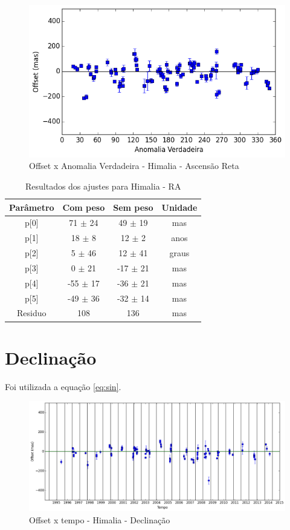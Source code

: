\documentclass[11pt,a4paper]{report}
\begin{document}
\begin{figure}[h]
\caption{Offset x Anomalia Verdadeira - Himalia - Ascensão Reta}
\includegraphics[scale=0.45]{Himalia/RA_anom.png}  
\end{figure}

\begin{table}[h!]
\caption{\label{Tab: Himalia-RA} Resultados dos ajustes para Himalia - RA}
\begin{centering}
\begin{tabular}{cccc}
\hline
\hline
Parâmetro & Com peso & Sem peso & Unidade\tabularnewline
\hline
p[0] & 71 $\pm$ 24 & 49 $\pm$ 19 & mas\\
p[1] & 18 $\pm$ 8 & 12 $\pm$ 2 & anos\\
p[2] & 5 $\pm$ 46 & 12 $\pm$ 41 & graus\\
p[3] & 0 $\pm$ 21 & -17 $\pm$ 21 & mas\\
p[4] & -55 $\pm$ 17 & -36 $\pm$ 21 & mas\\
p[5] & -49 $\pm$ 36 & -32 $\pm$ 14 & mas\\
Residuo & 108 & 136 & mas\\
\hline 
\end{tabular} 
\par\end{centering}
\end{table}

\section*{Declinação}

Foi utilizada a equação \ref{eq:sin}.

\begin{figure}[h]
\caption{Offset x tempo - Himalia - Declinação}
\includegraphics[scale=0.45]{Himalia/DEC.png} 
\end{figure}
\end{document}
